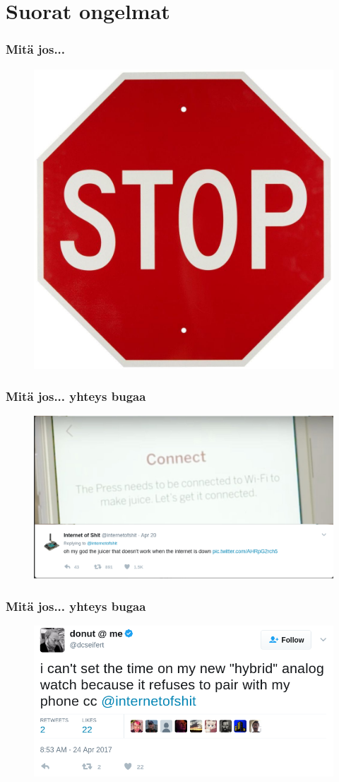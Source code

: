 \documentclass{beamer}
\begin{document}
\section{Suorat ongelmat}

\begin{frame}
\frametitle{Mitä jos...}
\begin{figure}
\includegraphics[width=0.6\linewidth]{stop}
\end{figure}
\end{frame}

\begin{frame}
\frametitle{Mitä jos... yhteys bugaa}
\begin{figure}
\includegraphics[width=\linewidth]{juicer}
\end{figure}
\end{frame}

\begin{frame}
\frametitle{Mitä jos... yhteys bugaa}
\begin{figure}
\includegraphics[width=\linewidth]{hybrid-watch}
\end{figure}
\end{frame}
\end{document}
